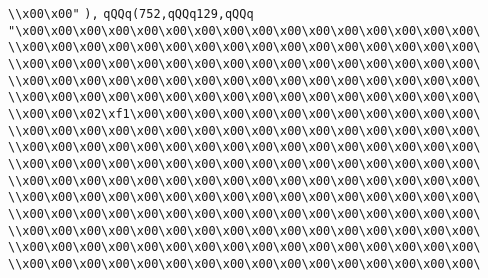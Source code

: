 \verb|\\x00\x00"|\newline
\verb|),|\newline
\verb|qQQq(752,qQQq129,qQQq|\newline
\verb|"\x00\x00\x00\x00\x00\x00\x00\x00\x00\x00\x00\x00\x00\x00\x00\x00\|\newline
\verb|\\x00\x00\x00\x00\x00\x00\x00\x00\x00\x00\x00\x00\x00\x00\x00\x00\|\newline
\verb|\\x00\x00\x00\x00\x00\x00\x00\x00\x00\x00\x00\x00\x00\x00\x00\x00\|\newline
\verb|\\x00\x00\x00\x00\x00\x00\x00\x00\x00\x00\x00\x00\x00\x00\x00\x00\|\newline
\verb|\\x00\x00\x00\x00\x00\x00\x00\x00\x00\x00\x00\x00\x00\x00\x00\x00\|\newline
\verb|\\x00\x00\x02\xf1\x00\x00\x00\x00\x00\x00\x00\x00\x00\x00\x00\x00\|\newline
\verb|\\x00\x00\x00\x00\x00\x00\x00\x00\x00\x00\x00\x00\x00\x00\x00\x00\|\newline
\verb|\\x00\x00\x00\x00\x00\x00\x00\x00\x00\x00\x00\x00\x00\x00\x00\x00\|\newline
\verb|\\x00\x00\x00\x00\x00\x00\x00\x00\x00\x00\x00\x00\x00\x00\x00\x00\|\newline
\verb|\\x00\x00\x00\x00\x00\x00\x00\x00\x00\x00\x00\x00\x00\x00\x00\x00\|\newline
\verb|\\x00\x00\x00\x00\x00\x00\x00\x00\x00\x00\x00\x00\x00\x00\x00\x00\|\newline
\verb|\\x00\x00\x00\x00\x00\x00\x00\x00\x00\x00\x00\x00\x00\x00\x00\x00\|\newline
\verb|\\x00\x00\x00\x00\x00\x00\x00\x00\x00\x00\x00\x00\x00\x00\x00\x00\|\newline
\verb|\\x00\x00\x00\x00\x00\x00\x00\x00\x00\x00\x00\x00\x00\x00\x00\x00\|\newline
\verb|\\x00\x00\x00\x00\x00\x00\x00\x00\x00\x00\x00\x00\x00\x00\x00\x00\|\newline
